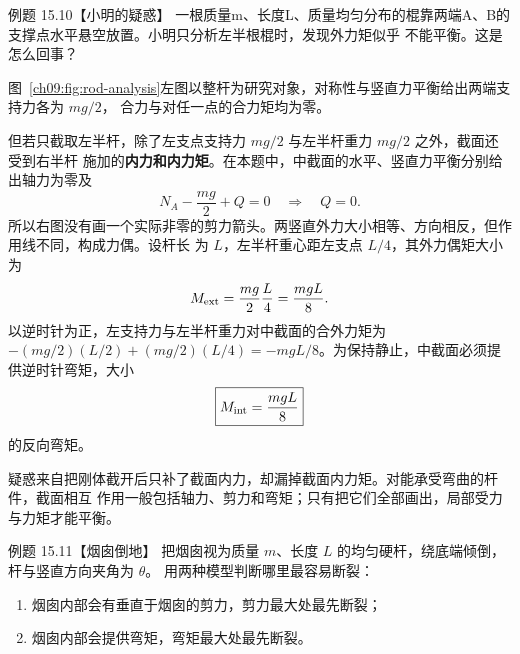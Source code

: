 \Needspace{0.34\textheight}
\begin{origexamplebox}{例题 15.10【小明的疑惑】}
一根质量m、长度L、质量均匀分布的棍靠两端A、B的支撑点水平悬空放置。小明只分析左半根棍时，发现外力矩似乎
不能平衡。这是怎么回事？
\supportedRodProblemDiagram
\end{origexamplebox}

\begin{xesolution}
图~\ref{ch09:fig:rod-analysis}左图以整杆为研究对象，对称性与竖直力平衡给出两端支持力各为 $mg/2$，
合力与对任一点的合力矩均为零。
\supportedRodDiagram

但若只截取左半杆，除了左支点支持力 $mg/2$ 与左半杆重力 $mg/2$ 之外，截面还受到右半杆
施加的\textbf{内力和内力矩}。在本题中，中截面的水平、竖直力平衡分别给出轴力为零及
\[
 N_A-\frac{mg}{2}+Q=0\quad\Longrightarrow\quad Q=0.
\]
所以右图没有画一个实际非零的剪力箭头。两竖直外力大小相等、方向相反，但作用线不同，构成力偶。设杆长
为 $L$，左半杆重心距左支点 $L/4$，其外力偶矩大小为
\[
 M_{\rm ext}=\frac{mg}{2}\frac L4=\frac{mgL}{8}.
\]
以逆时针为正，左支持力与左半杆重力对中截面的合外力矩为
$-(mg/2)(L/2)+(mg/2)(L/4)=-mgL/8$。为保持静止，中截面必须提供逆时针弯矩，大小
\[
 \boxed{M_{\rm int}=\frac{mgL}{8}}
\]
的反向弯矩。

疑惑来自把刚体截开后只补了截面内力，却漏掉截面内力矩。对能承受弯曲的杆件，截面相互
作用一般包括轴力、剪力和弯矩；只有把它们全部画出，局部受力与力矩才能平衡。
\end{xesolution}

\Needspace{0.42\textheight}
\begin{origexamplebox}{例题 15.11【烟囱倒地】}
把烟囱视为质量 $m$、长度 $L$ 的均匀硬杆，绕底端倾倒，杆与竖直方向夹角为 $\theta$。
用两种模型判断哪里最容易断裂：
\begin{enumerate}[label=(\arabic*),leftmargin=2.2em]
  \item 烟囱内部会有垂直于烟囱的剪力，剪力最大处最先断裂；
  \item 烟囱内部会提供弯矩，弯矩最大处最先断裂。
\end{enumerate}
\chimneyDiagram
\end{origexamplebox}

